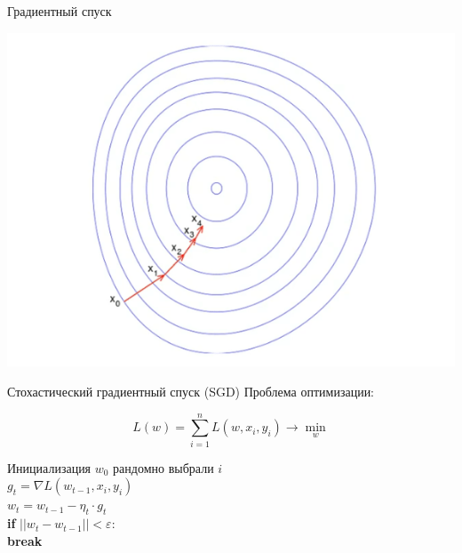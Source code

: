 \documentclass[notes,12pt, aspectratio=169]{beamer}
\newcommand{\pgr}[1]{{\color{green} \textbf{#1}}}
\begin{document}
\begin{frame}{Градиентный спуск}
\begin{center}
	\includegraphics[width=.6\linewidth]{2dgrad.png}
\end{center}
\end{frame}


\begin{frame}[fragile]{Стохастический градиентный спуск (SGD)}
Проблема оптимизации: 

\[   
L(w) = \sum_{i=1}^n L(w, x_i, y_i) \to \min_{w}
\]


Инициализация $w_0$ 
\hspace{15pt} рандомно выбрали $i$ \\
\pgr{\hspace{15pt}} $g_t = \nabla L(w_{t-1}, x_i, y_i)$ \\
\pgr{\hspace{15pt}} $w_t = w _{t-1} - \eta_t \cdot g_t  $ \\
\pgr{\hspace{15pt} if} $||w_t - w_{t-1}|| < \varepsilon:$ \\
\pgr{\hspace{30pt} break}
\end{frame}
\end{document}
